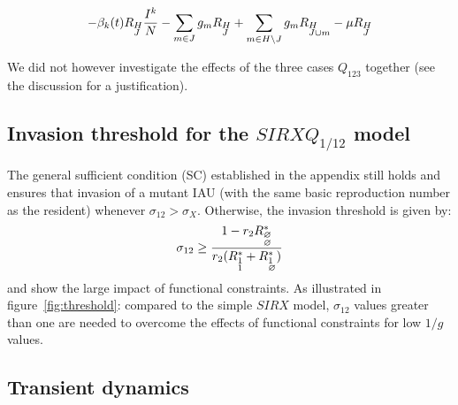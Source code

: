 \begin{footnotesize}
\begin{align}
    -\beta_k(t) R_{\begin{subarray}{l}H\\ J \end{subarray}}
    \frac{I^k}{N} - \sum_{m \in J} g_m R_{\begin{subarray}{l}H\\
        J \end{subarray}} + \sum_{m \in H \setminus J} g_m
    R_{\begin{subarray}{l}H\\ J\cup m \end{subarray}} -\mu
    R_{\begin{subarray}{l}H\\J \end{subarray}} \notag
  \end{align}
\end{footnotesize}


We did not however investigate the effects of the three cases
$Q_{123}$ together (see the discussion for a justification).
  
\subsection{Invasion threshold for the $SIRXQ_{1/12}$ model}

The general sufficient condition (SC) established in the appendix
still holds and ensures that invasion of a mutant IAU (with the same
basic reproduction number as the resident) whenever
$\sigma_{12}>\sigma_{X}$. Otherwise, the invasion threshold is given
by:
$$\sigma_{12} \geq \frac{1-r_2  R_{\begin{subarray}{l}\varnothing \\
      \varnothing \end{subarray}}^*}{r_2( R_{\begin{subarray}{l} 1 \\
      1 \end{subarray}}^* + R_{\begin{subarray}{l} 1 \\
      \varnothing \end{subarray}}^*)}$$ and show the large impact of
functional constraints. As illustrated in figure~\ref{fig:threshold}:
compared to the simple $SIRX$ model, $\sigma_{12}$ values greater than
one are needed to overcome the effects of functional constraints for
low $1/g$ values.

\subsection{Transient dynamics}


